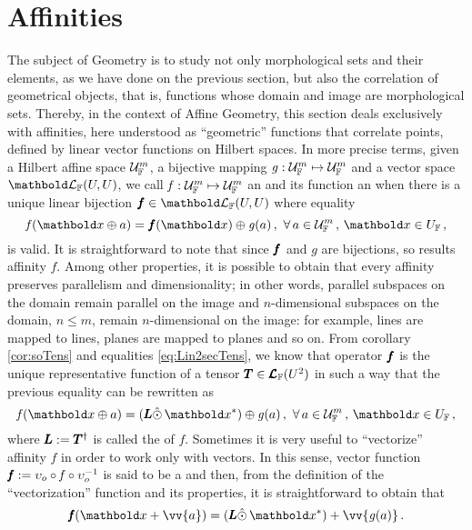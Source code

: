 \section{Affinities}\label{sec:aff}
The subject of Geometry is to study not only morphological sets and their elements, as we have done on the previous section, but also the correlation of geometrical objects, that is, functions whose domain and image are morphological sets. Thereby, in the context of Affine Geometry, this section deals exclusively with affinities, here understood as ``geometric'' functions that correlate points, defined by linear vector functions on Hilbert spaces. In more precise terms, given a Hilbert affine space $\eamd{U}{F}{m}$, a bijective mapping $\map{\mathit{g}}{\eamd{U}{F}{m}}{\eamd{U}{F}{m}}$ and a vector space $\evl{\cam{F}}{U}{U}$, we call  $\map{\mathit{f}}{\eamd{U}{F}{m}}{\eamd{U}{F}{m}}$ an  and its function an  when there is a unique linear bijection $\vtf{f}\in\evl{\cam{F}}{U}{U}$ where equality
\begin{equation}\label{eq:affty}
\fua{\mathit{f}}{\vto{x}\oplus a}=\fua{\vtf{f}}{\vto{x}}\oplus\fua{\mathit{g}}{a}\,,\,\,\forall\,a\in\eamd{U}{F}{m}\,,\,\vto{x}\in U_\cam{F}\,,
\end{equation}
is valid. It is straightforward to note that since $\vtf{f}$ and $\mathit{g}$ are bijections, so results affinity $\mathit{f}$. Among other properties, it is possible to obtain that every affinity preserves parallelism and dimensionality; in other words, parallel subspaces on the  domain remain parallel on the image and $n$-dimensional subspaces on the domain, $n\leq m$, remain $n$-dimensional on the image: for example, lines are mapped to lines, planes are mapped to planes and so on. From corollary \ref{cor:soTens} and equalities \eqref{eq:Lin2secTens}, we know that operator $\vtf{f}$ is the unique representative function of a tensor $\tnr{T}\in\ete{\cam{F}}{U^2}$ in such a way that the previous equality can be rewritten as
\begin{equation}\label{eq:afftyT}
\fua{\mathit{f}}{\vto{x}\oplus a}=(\tnr{L}\hat{\odot}\,\vto{x}^*)\oplus\fua{\mathit{g}}{a}\,,\,\,\forall\,a\in\eamd{U}{F}{m}\,,\,\vto{x}\in U_\cam{F}\,,
\end{equation}
where $\tnr{L}:=\tnr{T}^\dagger$ is called the  of $\mathit{f}$. Sometimes it is very useful to ``vectorize'' affinity $\mathit{f}$ in order to work only with vectors. In this sense, vector function $\tnr{\mathit{f}}:= \upsilon_o\circ\mathit{f}\circ\upsilon_o^{-1}$ is said to be a  and then, from the definition of the ``vectorization'' function and its properties, it is straightforward to obtain that 
\begin{equation}\label{eq:vecAffi}
\fua{\tnr{\mathit{f}}}{\vto{x}+ \vv{a}}=(\tnr{L}\hat{\odot}\,\vto{x}^*)+\vv{\fua{\mathit{g}}{a}}\,.
\end{equation}

